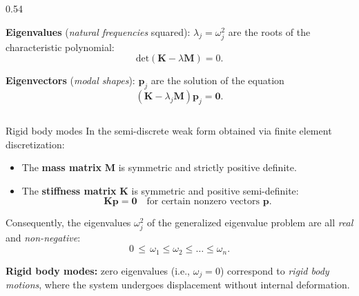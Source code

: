 \documentclass[aspectratio=169]{beamer}
\begin{document}
{\begin{frame}
\begin{columns}
\begin{column}{0.54\textwidth}
        \begin{block}{}
          \textbf{Eigenvalues} (\emph{natural frequencies} squared): $\lambda_j=\omega_j^2$ are the roots of the characteristic polynomial:
          $$\text{det}(\mathbf K-\lambda\mathbf M)=0.$$
        \end{block}
        \begin{block}{}
          \textbf{Eigenvectors} (\emph{modal shapes}): $\mathbf p_j$ are the solution of the equation
          $$(\mathbf{K} - \lambda_j \mathbf{M})\mathbf p_j=\mathbf 0.$$
        \end{block}
      \end{column}
    \end{columns}
  \end{frame}


  \begin{frame}{Rigid body modes}
    In the semi-discrete weak form obtained via finite element discretization:
    \begin{itemize}
      \item The \textbf{mass matrix} \( \mathbf{M} \) is symmetric and strictly positive definite.
      \item The \textbf{stiffness matrix} \( \mathbf{K} \) is symmetric and positive semi-definite:
            \[
              \mathbf{K} \mathbf{p} = \mathbf{0} \quad \text{for certain nonzero vectors } \mathbf{p}.
            \]
    \end{itemize}
    Consequently, the eigenvalues \( \omega_j^2 \) of the generalized eigenvalue problem are all \emph{real} and \emph{non-negative}:
    \[
      0 \,\leq\, \omega_1 \leq \omega_2 \leq \dots \leq \omega_n.
    \]

    \begin{block}{}
      \textbf{Rigid body modes:} zero eigenvalues (i.e., \( \omega_j = 0 \)) correspond to \emph{rigid body motions}, where the system undergoes displacement without internal deformation.
    \end{block}
  \end{frame}

}
\end{document}
